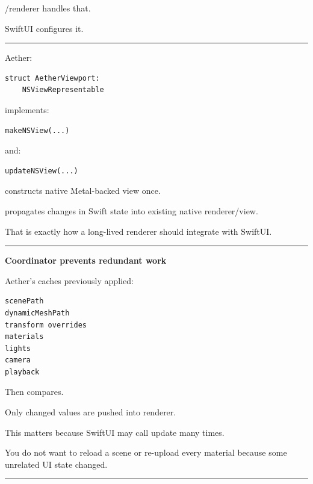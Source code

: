 /renderer handles that.

SwiftUI configures it.

\begin{center}\rule{0.5\linewidth}{0.5pt}\end{center}

\textbf{}

Aether:

\begin{verbatim}
struct AetherViewport:
    NSViewRepresentable
\end{verbatim}

implements:

\begin{verbatim}
makeNSView(...)
\end{verbatim}

and:

\begin{verbatim}
updateNSView(...)
\end{verbatim}

 constructs native Metal-backed view once.

 propagates changes in Swift state into existing native renderer/view.

That is exactly how a long-lived renderer should integrate with SwiftUI.

\begin{center}\rule{0.5\linewidth}{0.5pt}\end{center}

\textbf{Coordinator prevents redundant work}

Aether's  caches previously applied:

\begin{verbatim}
scenePath
dynamicMeshPath
transform overrides
materials
lights
camera
playback
\end{verbatim}

Then  compares.

Only changed values are pushed into renderer.

This matters because SwiftUI may call update many times.

You do not want to reload a scene or re-upload every material because some unrelated UI state changed.

\begin{center}\rule{0.5\linewidth}{0.5pt}\end{center}


